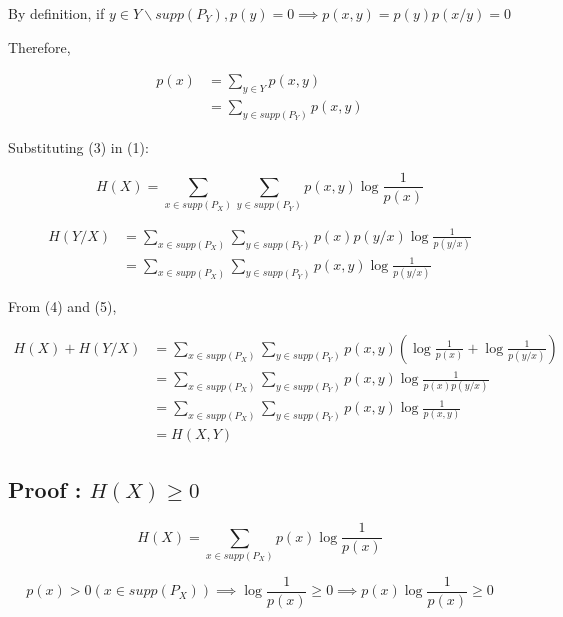 \documentclass{article}
\begin{document}
By definition, if $y \in Y \backslash supp(P_Y), p(y) = 0 \implies
p(x,y) = p(y)p(x/y) = 0$

Therefore, 

\begin{equation} \label{eq1}
\begin{split}
p(x) & = \sum_{y \in Y}p(x,y) \\
 & = \sum_{y \in supp(P_Y)}p(x,y)
\end{split}
\end{equation}

Substituting (3) in (1):

\begin{equation}
H(X) = \sum_{x \in supp(P_X)}\sum_{y \in supp(P_Y)}p(x,y) \log \frac {1}{p(x)} 
\end{equation}

\begin{equation}
\begin{split}
H(Y/X) &= \sum_{x \in supp(P_X)}\sum_{y \in supp(P_Y)}p(x)p(y/x)\log \frac {1}{p(y/x)} \\
&= \sum_{x \in supp(P_X)}\sum_{y \in supp(P_Y)}p(x,y)\log \frac {1}{p(y/x)}
\end{split}
\end{equation}

From (4) and (5),

\begin{equation*}
\begin{split}
 H(X) + H(Y/X) &=\sum_{x \in supp(P_X)}\sum_{y \in supp(P_Y)}p(x,y)(\log \frac {1}{p(x)} + \log \frac {1}{p(y/x)}) \\
 &=\sum_{x \in supp(P_X)}\sum_{y \in supp(P_Y)}p(x,y)\log \frac {1}{p(x)p(y/x)} \\
  &=\sum_{x \in supp(P_X)}\sum_{y \in supp(P_Y)}p(x,y)\log \frac {1}{p(x,y)} \\
  &= H(X,Y)
 \end{split}
\end{equation*}

\subsection*{ Proof : $H(X) \geq 0$}

\begin{equation*}
H(X) = \sum_{x \in supp(P_X)}p(x) \log \frac {1}{p(x)} 
\end{equation*}

\begin{equation*}
p(x) > 0 (x \in supp(P_X)) \implies \log \frac {1}{p(x)} \geq 0 \implies 
p(x) \log \frac {1}{p(x)} \geq 0
\end{equation*}
\end{document}
